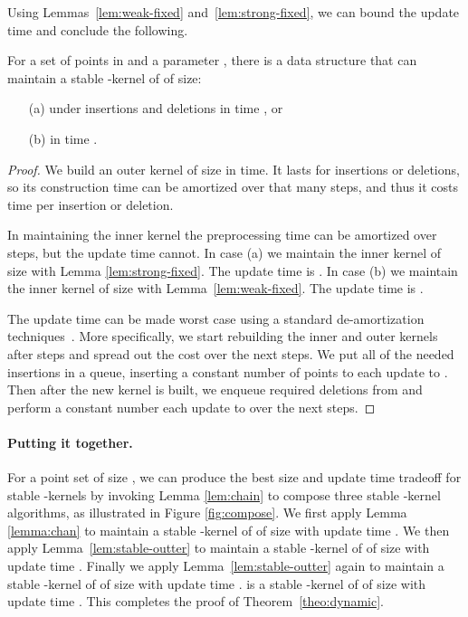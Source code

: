\documentclass[11pt]{myclass}
\begin{document}
Using Lemmas~\ref{lem:weak-fixed} and~\ref{lem:strong-fixed}, we can
bound the update time and conclude the following.
\begin{lemma}
For a set  of  points in  and a parameter 
, there is a data structure that can maintain 
a stable -kernel of  of size:
\begin{itemize} \denselist
\item[(a)]  under insertions and deletions in time 
, or
\item[(b)]  in time .
\end{itemize}
\label{lem:stable-outter}
\end{lemma}

\begin{proof}
We build an outer kernel of size  in  time.  It lasts for  insertions or deletions, so its construction time can be amortized over that many steps, and thus it costs  time per insertion or deletion.

In maintaining the inner kernel the preprocessing time can be amortized over  steps, but the update time cannot.  
In case (a) we maintain the inner kernel of size  with Lemma \ref{lem:strong-fixed}.  The update time is .  
In case (b) we maintain the inner kernel of size  with Lemma~\ref{lem:weak-fixed}.  The update time is .  

The update time can be made worst case using a standard de-amortization techniques~\cite{Ove83}.  More specifically, we start rebuilding the inner and outer kernels after  steps and spread out the cost over the next  steps.  We put all of the needed insertions in a queue, inserting a constant number of points to  each update to .  Then after the new kernel is built, we enqueue required deletions from  and perform a constant number each update to  over the next  steps.  
\end{proof}

\paragraph{Putting it together.}

For a point set  of size , we can produce the 
best size and update time tradeoff for stable -kernels by 
invoking Lemma \ref{lem:chain} to compose three stable -kernel 
algorithms, as illustrated in Figure \ref{fig:compose}.  
We first apply Lemma \ref{lemma:chan} to maintain a stable 
-kernel  of  of size  
with update time .  
We then apply Lemma~\ref{lem:stable-outter} to maintain a stable 
-kernel  of  of size  
with update time .  
Finally we apply Lemma~\ref{lem:stable-outter} again to maintain a 
stable -kernel  of  of size 
 with update time 
.  
 is a stable -kernel of  of size
 with update time .  This completes the proof of
Theorem~\ref{theo:dynamic}.
\end{document}
